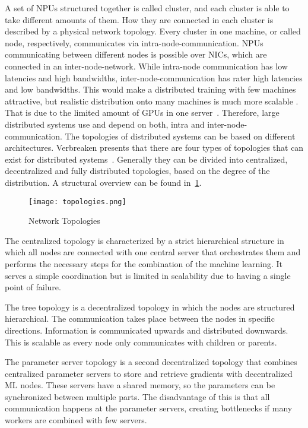 A set of \acp{NPU} structured together is called cluster, and each cluster is able to take different amounts of them. How they are connected in each cluster is described by a physical network topology. Every cluster in one machine, or called node, respectively, communicates via intra-node-communication. \acp{NPU} communicating between different nodes is possible over \acp{NIC}, which are connected in an inter-node-network.
While intra-node communication has low latencies and high bandwidths, inter-node-communication has rater high latencies and low bandwidths. This would make a distributed training with few machines attractive, but realistic distribution onto many machines is much more scalable \cite{}. That is due to the limited amount of \acp{GPU} in one server~\cite{}. Therefore, large distributed systems use and depend on both, intra and inter-node-communication.
The topologies of distributed systems can be based on different architectures. Verbreaken presents that there are four types of topologies that can exist for distributed systems~\cite{verbraeken_survey_2020}. Generally they can be divided into centralized, decentralized and fully distributed topologies, based on the degree of the distribution. A structural overview can be found in~\ref{fig:topologies}.


\begin{figure}[H]  %
  \centering
  \texttt{[image: topologies.png]}
  \caption{Network Topologies}
  \label{fig:topologies}
\end{figure}

The centralized topology is characterized by a strict hierarchical structure in which all nodes are connected with one central server that orchestrates them and performs the necessary steps for the combination of the machine learning. It serves a simple coordination but is limited in scalability due to having a single point of failure.

The tree topology is a decentralized topology in which the nodes are structured hierarchical. The communication takes place between the nodes in specific directions. Information is communicated upwards and distributed downwards. This is scalable as every node only communicates with children or parents.

The parameter server topology is a second decentralized topology that combines centralized parameter servers to store and retrieve gradients with decentralized \ac{ML} nodes. These servers have a shared memory, so the parameters can be synchronized between multiple parts. The disadvantage of this is that all communication happens at the parameter servers, creating bottlenecks if many workers are combined with few servers.


